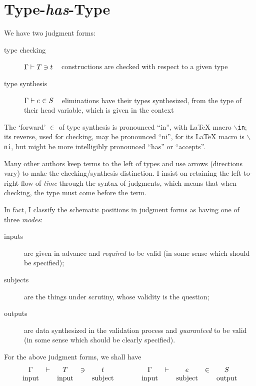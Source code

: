 \documentclass[natbib]{article}
\begin{document}
\section{Type-\emph{has}-Type}

We have two judgment forms:
\begin{description}
\item[type checking] $\Gamma \vdash T \ni t$ ~ constructions are checked with respect to a given type
\item[type synthesis] $\Gamma \vdash e \in S$ ~ eliminations have their types synthesized, from the type of their head variable, which is given in the context
\end{description}
The `forward' $\in$ of type synthesis is pronounced ``in'', with \LaTeX{} macro {\tt $\backslash$in}; its reverse, used for checking, may be pronounced ``ni'', for its \LaTeX{} macro is {\tt $\backslash$ni}, but
might be more intelligibly pronounced ``has'' or ``accepts''.

Many other authors keep terms to the left of types and use arrows (directions vary) to make the checking/synthesis distinction. I insist on retaining the left-to-right flow of \emph{time} through the
syntax of judgments, which means that when checking, the type must come before the term.

In fact, I classify the schematic positions in judgment forms as having one of three \emph{modes}:
\begin{description}
\item[inputs] are given in advance and \emph{required} to be valid (in some sense which should be specified);
\item[subjects] are the things under scrutiny, whose validity is the question;
\item[outputs] are data synthesized in the validation process and \emph{guaranteed} to be valid
  (in some sense which should be clearly specified).
\end{description}

For the above judgment forms, we shall have
\[\begin{array}{ccccc@{\qquad\qquad}ccccc}
\CHK{\Gamma&}{&T&}{&t} & \SYN{\Gamma&}{&e&}{&S}\\
\mbox{input} && \mbox{input} && \mbox{subject} &
\mbox{input} && \mbox{subject} && \mbox{output}
\end{array}\]
\end{document}
